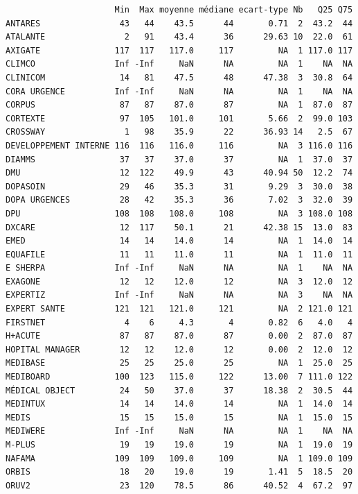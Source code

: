 \documentclass[]{article}
\begin{document}
\begin{verbatim}
                      Min  Max moyenne médiane ecart-type Nb   Q25 Q75
ANTARES                43   44    43.5      44       0.71  2  43.2  44
ATALANTE                2   91    43.4      36      29.63 10  22.0  61
AXIGATE               117  117   117.0     117         NA  1 117.0 117
CLIMCO                Inf -Inf     NaN      NA         NA  1    NA  NA
CLINICOM               14   81    47.5      48      47.38  3  30.8  64
CORA URGENCE          Inf -Inf     NaN      NA         NA  1    NA  NA
CORPUS                 87   87    87.0      87         NA  1  87.0  87
CORTEXTE               97  105   101.0     101       5.66  2  99.0 103
CROSSWAY                1   98    35.9      22      36.93 14   2.5  67
DEVELOPPEMENT INTERNE 116  116   116.0     116         NA  3 116.0 116
DIAMMS                 37   37    37.0      37         NA  1  37.0  37
DMU                    12  122    49.9      43      40.94 50  12.2  74
DOPASOIN               29   46    35.3      31       9.29  3  30.0  38
DOPA URGENCES          28   42    35.3      36       7.02  3  32.0  39
DPU                   108  108   108.0     108         NA  3 108.0 108
DXCARE                 12  117    50.1      21      42.38 15  13.0  83
EMED                   14   14    14.0      14         NA  1  14.0  14
EQUAFILE               11   11    11.0      11         NA  1  11.0  11
E SHERPA              Inf -Inf     NaN      NA         NA  1    NA  NA
EXAGONE                12   12    12.0      12         NA  3  12.0  12
EXPERTIZ              Inf -Inf     NaN      NA         NA  3    NA  NA
EXPERT SANTE          121  121   121.0     121         NA  2 121.0 121
FIRSTNET                4    6     4.3       4       0.82  6   4.0   4
H+ACUTE                87   87    87.0      87       0.00  2  87.0  87
HOPITAL MANAGER        12   12    12.0      12       0.00  2  12.0  12
MEDIBASE               25   25    25.0      25         NA  1  25.0  25
MEDIBOARD             100  123   115.0     122      13.00  7 111.0 122
MÉDICAL OBJECT         24   50    37.0      37      18.38  2  30.5  44
MEDINTUX               14   14    14.0      14         NA  1  14.0  14
MEDIS                  15   15    15.0      15         NA  1  15.0  15
MEDIWERE              Inf -Inf     NaN      NA         NA  1    NA  NA
M-PLUS                 19   19    19.0      19         NA  1  19.0  19
NAFAMA                109  109   109.0     109         NA  1 109.0 109
ORBIS                  18   20    19.0      19       1.41  5  18.5  20
ORUV2                  23  120    78.5      86      40.52  4  67.2  97

\end{verbatim}
\end{document}
